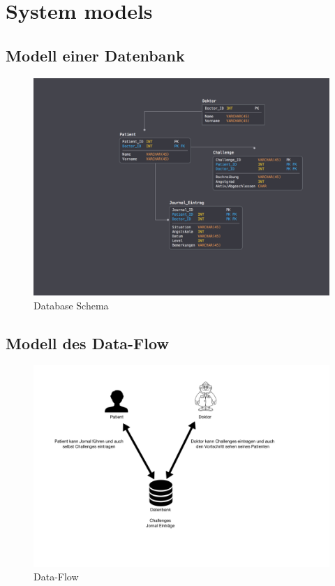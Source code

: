 \chapter{System models}

\section{Modell einer Datenbank}
\begin{figure}[H]
\includegraphics[width=1\textwidth]{System_models_Database_Task02.jpg}
\caption{Database Schema}
\end{figure}

\section{Modell des Data-Flow}
\begin{figure}[H]
\includegraphics[width=1\textwidth]{System_models_Semantic_task02.jpg}
\caption{Data-Flow}
\end{figure}
